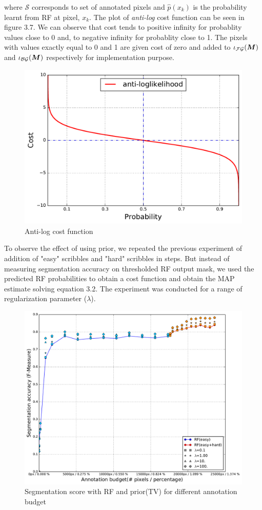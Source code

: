 where $\mathcal{S}$ corresponds to set of annotated pixels and $\widehat{p}(x_{k})$ is the probability learnt from RF at pixel, $x_k$. The plot of \textit{anti-log} cost function can be seen in figure 3.7. We can observe that cost tends to positive infinity for probablity values close to 0 and, to negative infinity for probablity close to 1. The pixels with values exactly equal to 0 and 1 are given cost of zero and added to $\iota_{\mathcal{FG}}(\boldsymbol{M})$ and $\iota_{\mathcal{BG}}(\boldsymbol{M})$ respectively for implementation purpose.

\begin{figure}[h!] \label{fig:nll}
\centering
 \includegraphics[width=0.75\linewidth]{figures/nll_func.pdf}
\caption{Anti-log cost function}
\end{figure}

To observe the effect of using prior, we repeated the previous experiment of addition of "easy" scribbles and "hard" scribbles in steps. But instead of measuring segmentation accuracy on thresholded RF output mask, we used the predicted RF probabilities to obtain a cost function and obtain the MAP estimate solving equation 3.2. The experiment was conducted for a range of regularization parameter ($\lambda$).


\begin{figure}[h!] \label{fig:rf_vip}
\centering
 \includegraphics[width=0.75\linewidth]{figures/rf_vip_easy_hard_full.pdf}
\caption{Segmentation score with RF and prior(TV) for different annotation budget}
\end{figure}

